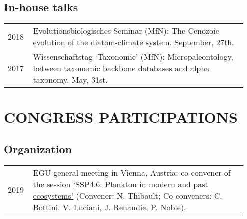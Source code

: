 \documentclass[11pt, a4paper]{article}
\begin{document}
\subsection{In-house talks}
\begin{longtable}{p{0.1\linewidth} P{0.85\linewidth}}
2018 & Evolutionsbiologisches Seminar (MfN): The Cenozoic evolution of the diatom-climate system. September, 27th.\\
2017 & Wissenschaftstag `Taxonomie' (MfN): Micropaleontology, between taxonomic backbone databases and alpha taxonomy. May, 31st.\\
\end{longtable}

\section{CONGRESS PARTICIPATIONS}
\subsection{Organization}
\begin{longtable}{p{0.1\linewidth} P{0.85\linewidth}}
2019 & EGU general meeting in Vienna, Austria: co-convener of the session \href{https://meetingorganizer.copernicus.org/EGU2019/session/31041}{`SSP4.6: Plankton in modern and past ecosystems'} (Convener: N. Thibault; Co-conveners: C. Bottini, V. Luciani, J. Renaudie, P. Noble).
\end{longtable}
\end{document}
